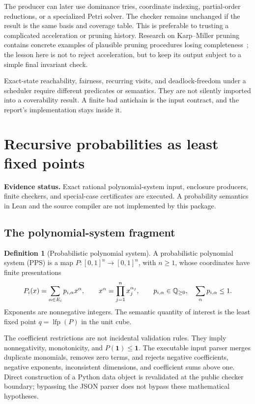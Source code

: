 \documentclass[11pt,a4paper]{article}
\theoremstyle{definition}\newtheorem{definition}[theorem]{Definition}
\theoremstyle{remark}\newtheorem{remark}[theorem]{Remark}
\newcommand{\one}{\mathbf 1}\newcommand{\zero}{\mathbf 0}
\newcommand{\lfp}{\operatorname{lfp}}\newcommand{\diag}{\operatorname{diag}}
\newcommand{\status}[1]{\noindent\textbf{Evidence status.} #1\par}
\begin{document}
The producer can later use dominance tries, coordinate indexing, partial-order reductions, or a specialized Petri solver. The checker remains unchanged if the result is the same basis and coverage table. This is preferable to trusting a complicated acceleration or pruning history. Research on Karp--Miller pruning contains concrete examples of plausible pruning procedures losing completeness~\cite{reynier-servais}; the lesson here is not to reject acceleration, but to keep its output subject to a simple final invariant check.

Exact-state reachability, fairness, recurring visits, and deadlock-freedom under a scheduler require different predicates or semantics. They are not silently imported into a coverability result. A finite bad antichain is the input contract, and the report's implementation stays inside it.



\section{Recursive probabilities as least fixed points}
\label{sec:pps}
\status{Exact rational polynomial-system input, enclosure producers, finite checkers, and special-case certificates are executed. A probability semantics in Lean and the source compiler are not implemented by this package.}

\subsection{The polynomial-system fragment}
\begin{definition}[Probabilistic polynomial system]
A probabilistic polynomial system (PPS) is a map $P:[0,1]^n\to[0,1]^n$, with $n\ge1$, whose coordinates have finite presentations
\begin{equation}
 \label{eq:pps}
 P_i(x)=\sum_{\alpha\in E_i}p_{i,\alpha}x^\alpha,
 \qquad x^\alpha=\prod_{j=1}^{n}x_j^{\alpha_j},
 \qquad p_{i,\alpha}\in\mathbb Q_{\ge0},\quad
 \sum_\alpha p_{i,\alpha}\le1.
\end{equation}
Exponents are nonnegative integers. The semantic quantity of interest is the least fixed point $q=\lfp(P)$ in the unit cube.
\end{definition}

The coefficient restrictions are not incidental validation rules. They imply nonnegativity, monotonicity, and $P(\one)\le\one$. The executable input parser merges duplicate monomials, removes zero terms, and rejects negative coefficients, negative exponents, inconsistent dimensions, and coefficient sums above one. Direct construction of a Python data object is revalidated at the public checker boundary; bypassing the JSON parser does not bypass these mathematical hypotheses.
\end{document}
